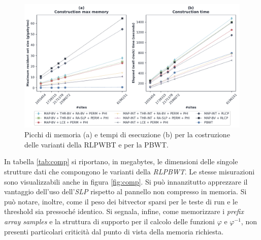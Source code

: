 \begin{figure}
  \centering
  \includegraphics[width=\linewidth]{img/make_time_mem_paper}
  \caption{Picchi di memoria (a) e tempi di esecuzione (b) per  la
    costruzione delle varianti della RLPWBT e per 
    la PBWT.}
  \label{fig:maketimememchr}
\end{figure}
In tabella \ref{tab:comp} si riportano, in megabytes, le dimensioni delle
singole strutture dati che compongono le varianti della \textit{RLPBWT}. Le
stesse misurazioni sono visualizzabili anche in figura \ref{fig:comp}. Si può
innanzitutto apprezzare il vantaggio dell'uso dell'\textit{SLP} rispetto al
pannello non compresso in memoria. Si può notare, inoltre, come il peso dei
bitvector sparsi per le teste di run e le threshold sia pressoché identico. Si
segnala, infine, come memorizzare i \textit{prefix array samples} e la struttura
di supporto per il calcolo delle funzioni $\varphi$ e $\varphi^{-1}$, non
presenti particolari criticità dal punto di vista della memoria richiesta.
